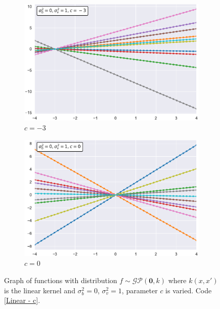 \begin{figure}[h]
\centering
\begin{subfigure}{.5\textwidth}
  \centering
  \includegraphics[width=\linewidth]{images/Gaussian process/Linear - c=-3.pdf}
  \caption{$c=-3$}
\end{subfigure}%
\begin{subfigure}{.5\textwidth}
  \centering
  \includegraphics[width=\linewidth]{images/Gaussian process/Linear - c=0.pdf}
  \caption{$c=0$}
\end{subfigure}
\caption{Graph of functions with distribution $f\sim \mathcal{GP}(\bm{0},k)$ where $k(x,x')$ is the linear kernel and $\sigma_b^2=0$, $\sigma_v^2=1$, parameter $c$ is varied. Code \ref{Linear - c}.}
\label{10 sample linear modified c}
\end{figure}


